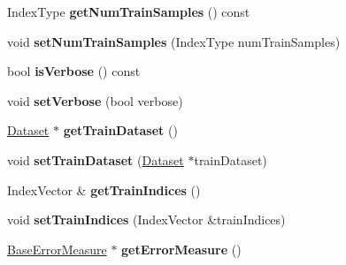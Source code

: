 \begin{DoxyCompactItemize}
\item 
\hypertarget{classffactory_1_1_base_classifier_a1d965abe43be8fc4e07bd6b69d67ba1d}{Index\-Type {\bfseries get\-Num\-Train\-Samples} () const }\label{classffactory_1_1_base_classifier_a1d965abe43be8fc4e07bd6b69d67ba1d}

\item 
\hypertarget{classffactory_1_1_base_classifier_a7afc4e7b030cd51444c6c31f192c368d}{void {\bfseries set\-Num\-Train\-Samples} (Index\-Type num\-Train\-Samples)}\label{classffactory_1_1_base_classifier_a7afc4e7b030cd51444c6c31f192c368d}

\item 
\hypertarget{classffactory_1_1_base_classifier_a6ba6914a0ff543fded2d0df1945d7e51}{bool {\bfseries is\-Verbose} () const }\label{classffactory_1_1_base_classifier_a6ba6914a0ff543fded2d0df1945d7e51}

\item 
\hypertarget{classffactory_1_1_base_classifier_a637e5d80d159e0749b15131358b02dc3}{void {\bfseries set\-Verbose} (bool verbose)}\label{classffactory_1_1_base_classifier_a637e5d80d159e0749b15131358b02dc3}

\item 
\hypertarget{classffactory_1_1_base_classifier_af37b1fd7f706c3eb41b53b6ca07288b7}{\hyperlink{classffactory_1_1_dataset}{Dataset} $\ast$ {\bfseries get\-Train\-Dataset} ()}\label{classffactory_1_1_base_classifier_af37b1fd7f706c3eb41b53b6ca07288b7}

\item 
\hypertarget{classffactory_1_1_base_classifier_a17ea29ce32addd94ea9c562a60a90288}{void {\bfseries set\-Train\-Dataset} (\hyperlink{classffactory_1_1_dataset}{Dataset} $\ast$train\-Dataset)}\label{classffactory_1_1_base_classifier_a17ea29ce32addd94ea9c562a60a90288}

\item 
\hypertarget{classffactory_1_1_base_classifier_aefd0240b6634ca6df4c85e53ef363e2f}{Index\-Vector \& {\bfseries get\-Train\-Indices} ()}\label{classffactory_1_1_base_classifier_aefd0240b6634ca6df4c85e53ef363e2f}

\item 
\hypertarget{classffactory_1_1_base_classifier_af918439bc7ec053abde1ddd9f460f71d}{void {\bfseries set\-Train\-Indices} (Index\-Vector \&train\-Indices)}\label{classffactory_1_1_base_classifier_af918439bc7ec053abde1ddd9f460f71d}

\item 
\hypertarget{classffactory_1_1_base_classifier_aa02807120d614d6a5f3bc84e4a334303}{\hyperlink{classffactory_1_1_base_error_measure}{Base\-Error\-Measure} $\ast$ {\bfseries get\-Error\-Measure} ()}\label{classffactory_1_1_base_classifier_aa02807120d614d6a5f3bc84e4a334303}


\end{DoxyCompactItemize}
